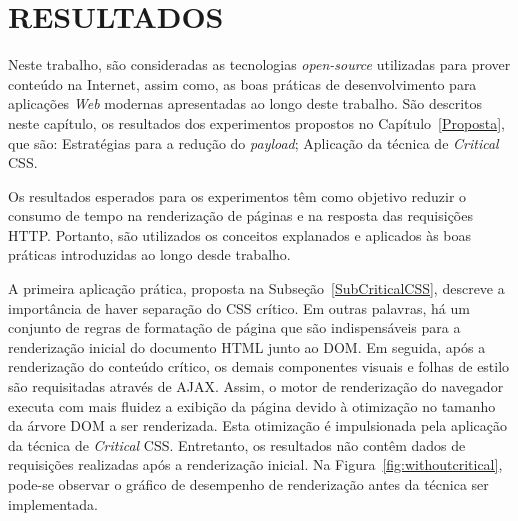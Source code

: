 \chapter{RESULTADOS}
\label{Resultados}

Neste trabalho, são consideradas as tecnologias \textit{open-source} utilizadas para prover conteúdo na Internet, assim como, as boas práticas de desenvolvimento para aplicações \textit{Web} modernas apresentadas ao longo deste trabalho. São descritos neste capítulo, os resultados dos experimentos propostos no Capítulo~\ref{Proposta}, que são: Estratégias para a redução do \textit{payload}; Aplicação da técnica de \textit{Critical} CSS.

Os resultados esperados para os experimentos têm como objetivo reduzir o consumo de tempo na renderização de páginas e na resposta das requisições HTTP. Portanto, são utilizados os conceitos explanados e aplicados às boas práticas introduzidas ao longo desde trabalho.

A primeira aplicação prática, proposta na Subseção~\ref{SubCriticalCSS}, descreve a importância de haver separação do CSS crítico. Em outras palavras, há um conjunto de regras de formatação de página que são indispensáveis para a renderização inicial do documento HTML junto ao DOM. Em seguida, após a renderização do conteúdo crítico, os demais componentes visuais e folhas de estilo são requisitadas através de AJAX. Assim, o motor de renderização do navegador executa com mais fluidez a exibição da página devido à otimização no tamanho da árvore DOM a ser renderizada. Esta otimização é impulsionada pela aplicação da técnica de \textit{Critical} CSS. Entretanto, os resultados não contêm dados de requisições realizadas após a renderização inicial. Na Figura~\ref{fig:withoutcritical}, pode-se observar o gráfico de desempenho de renderização antes da técnica ser implementada.

\begin{figure}[th]
\end{figure}

